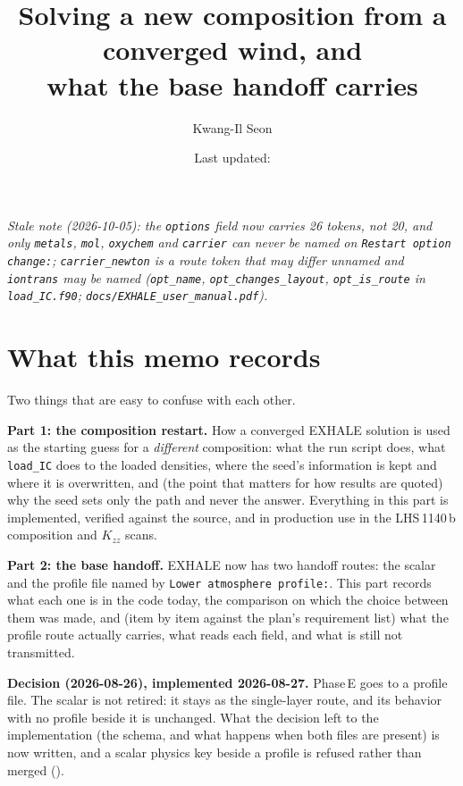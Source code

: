 \documentclass[english,a4paper]{my_memo}
\title{Solving a new composition from a converged wind, and\\
       what the base handoff carries}
\author{Kwang-Il Seon}
\date{Last updated: \docmoddate}
\begin{document}
\maketitle

\noindent\textit{Stale note (2026-10-05): the \texttt{options} field now carries 26 tokens, not 20, and only \texttt{metals}, \texttt{mol}, \texttt{oxychem} and \texttt{carrier} can never be named on \texttt{Restart option change:}; \texttt{carrier\_newton} is a route token that may differ unnamed and \texttt{iontrans} may be named (\texttt{opt\_name}, \texttt{opt\_changes\_layout}, \texttt{opt\_is\_route} in \texttt{load\_IC.f90}; \texttt{docs/EXHALE\_user\_manual.pdf}).}

\section{What this memo records}

Two things that are easy to confuse with each other.

\medskip
\noindent\textbf{Part 1: the composition restart.} How a converged EXHALE
solution is used as the starting guess for a \emph{different} composition:
what the run script does, what \verb|load_IC| does to the loaded densities,
where the seed's information is kept and where it is overwritten, and
(the point that matters for how results are quoted) why the seed sets only
the path and never the answer. Everything in this part is implemented,
verified against the source, and in production use in the LHS\,1140\,b
composition and $K_{zz}$ scans.

\medskip
\noindent\textbf{Part 2: the base handoff.} EXHALE now has two handoff
routes: the scalar  and the profile file named by
\verb|Lower atmosphere profile:|. This part records what each one is in the
code today, the comparison on which the choice between them was made, and
(item by item against the plan's requirement list) what the profile
route actually carries, what reads each field, and what is still not
transmitted.

\medskip
\noindent\textbf{Decision (2026-08-26), implemented 2026-08-27.} Phase\,E
goes to a profile file. The scalar  is not retired: it stays
as the single-layer route, and its behavior with no profile beside it is
unchanged. What the decision left to the implementation (the schema, and
what happens when both files are present) is now written, and a scalar
physics key beside a profile is refused rather than merged
().
\end{document}
